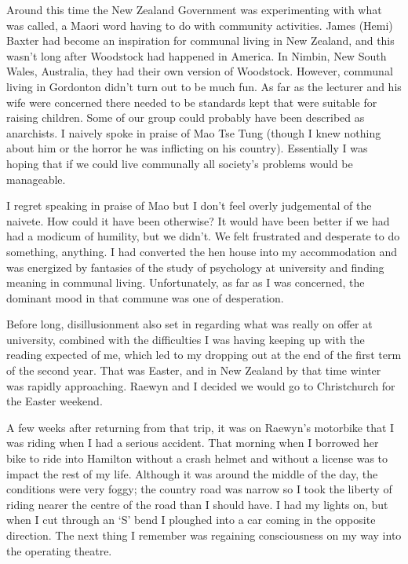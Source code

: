 Around this time the New Zealand Government was experimenting with what
was called\cite{ohu}, a Maori word having to do with community activities. James
(Hemi) Baxter had become an inspiration for communal living in New
Zealand, and this wasn't long after Woodstock had happened in America.
In Nimbin, New South Wales, Australia, they had their own version of
Woodstock. However, communal living in Gordonton didn't turn out to be
much fun. As far as the lecturer and his wife were concerned there
needed to be standards kept that were suitable for raising children.
Some of our group could probably have been described as anarchists. I
naively spoke in praise of Mao Tse Tung (though I knew nothing about him
or the horror he was inflicting on his country). Essentially I was
hoping that if we could live communally all society's problems would be
manageable.

I regret speaking in praise of Mao but I don't feel overly judgemental
of the naivete. How could it have been otherwise? It would have been
better if we had had a modicum of humility, but we didn't. We felt
frustrated and desperate to do something, anything. I had converted the
hen house into my accommodation and was energized by fantasies of the
study of psychology at university and finding meaning in communal
living. Unfortunately, as far as I was concerned, the dominant mood in
that commune was one of desperation.

Before long, disillusionment also set in regarding what was really on
offer at university, combined with the difficulties I was having keeping
up with the reading expected of me, which led to my dropping out at the
end of the first term of the second year. That was Easter, and in New
Zealand by that time winter was rapidly approaching. Raewyn and I
decided we would go to Christchurch for the Easter weekend.

A few weeks after returning from that trip, it was on Raewyn's motorbike
that I was riding when I had a serious accident. That morning when I
borrowed her bike to ride into Hamilton without a crash helmet and
without a license was to impact the rest of my life. Although it was
around the middle of the day, the conditions were very foggy; the
country road was narrow so I took the liberty of riding nearer the
centre of the road than I should have. I had my lights on, but when I
cut through an `S' bend I ploughed into a car coming in the opposite
direction. The next thing I remember was regaining consciousness on my
way into the operating theatre.

